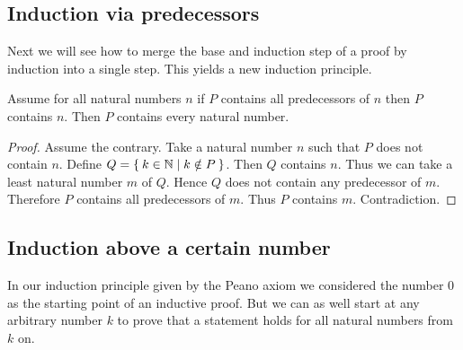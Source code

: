 \documentclass[../../arithmetic.tex]{subfiles}
\begin{document}
  \subsection{Induction via predecessors}

  Next we will see how to merge the base and induction step of a proof by
  induction into a single step. This yields a new induction principle.

  \begin{forthel}
    \begin{theorem}\label{Arithmetic_02_05_167446}
      Assume for all natural numbers $n$ if $P$ contains all predecessors of $n$ then $P$ contains $n$.
      Then $P$ contains every natural number.
    \end{theorem}
    \begin{proof}
      Assume the contrary.
      Take a natural number $n$ such that $P$ does not contain $n$.
      Define $Q = \Set{k \in \mathbb{N} | k \notin P}$.
      Then $Q$ contains $n$.
      Thus we can take a least natural number $m$ of $Q$.
      Hence $Q$ does not contain any predecessor of $m$.
      Therefore $P$ contains all predecessors of $m$.
      Thus $P$ contains $m$.
      Contradiction.
    \end{proof}
  \end{forthel}


  \subsection{Induction above a certain number}

  In our induction principle given by the  Peano axiom we considered the
  number $0$ as the starting point of an inductive proof. But we can as well
  start at any arbitrary number $k$ to prove that a statement holds for all
  natural numbers from $k$ on.
\end{document}
